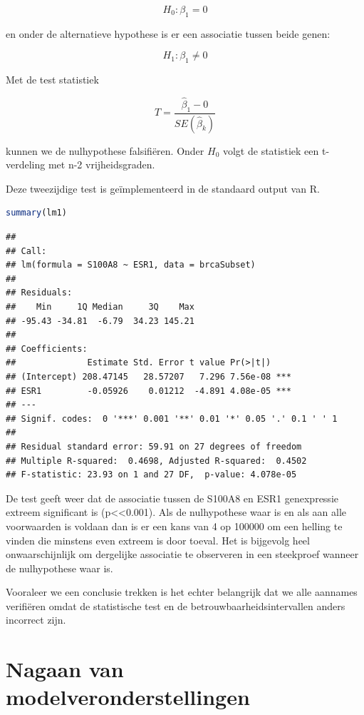 \documentclass[
  12pt,dutch,coursenotes]{book}
\theoremstyle{definition}
\theoremstyle{definition}
\theoremstyle{definition}
\theoremstyle{definition}
\theoremstyle{remark}
\begin{document}
\[H_0: \beta_1=0\]

en onder de alternatieve hypothese is er een associatie tussen beide genen:

\[H_1: \beta_1\neq0\]

Met de test statistiek

\[T=\frac{\hat{\beta}_1-0}{SE(\hat{\beta}_k)}\]

kunnen we de nulhypothese falsifiëren. Onder \(H_0\) volgt de statistiek een t-verdeling met n-2 vrijheidsgraden.

Deze tweezijdige test is geïmplementeerd in de standaard output van R.

\begin{lstlisting}[language=R]
summary(lm1)
\end{lstlisting}

\begin{lstlisting}
## 
## Call:
## lm(formula = S100A8 ~ ESR1, data = brcaSubset)
## 
## Residuals:
##    Min     1Q Median     3Q    Max 
## -95.43 -34.81  -6.79  34.23 145.21 
## 
## Coefficients:
##              Estimate Std. Error t value Pr(>|t|)    
## (Intercept) 208.47145   28.57207   7.296 7.56e-08 ***
## ESR1         -0.05926    0.01212  -4.891 4.08e-05 ***
## ---
## Signif. codes:  0 '***' 0.001 '**' 0.01 '*' 0.05 '.' 0.1 ' ' 1
## 
## Residual standard error: 59.91 on 27 degrees of freedom
## Multiple R-squared:  0.4698, Adjusted R-squared:  0.4502 
## F-statistic: 23.93 on 1 and 27 DF,  p-value: 4.078e-05
\end{lstlisting}

De test geeft weer dat de associatie tussen de S100A8 en ESR1 genexpressie extreem significant is (p\textless\textless0.001). Als de nulhypothese waar is en als aan alle voorwaarden is voldaan dan is er een kans van 4 op 100000 om een helling te vinden die minstens even extreem is door toeval. Het is bijgevolg heel onwaarschijnlijk om dergelijke associatie te observeren in een steekproef wanneer de nulhypothese waar is.

Vooraleer we een conclusie trekken is het echter belangrijk dat we alle aannames verifiëren omdat de statistische test en de betrouwbaarheidsintervallen anders incorrect zijn.

\hypertarget{nagaan-van-modelveronderstellingen}{%
\section{Nagaan van modelveronderstellingen}\label{nagaan-van-modelveronderstellingen}}
\end{document}
